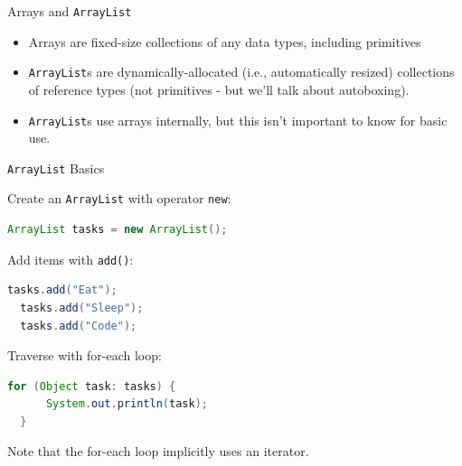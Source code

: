 \documentclass{beamer}
\begin{document}
\begin{frame}[fragile]{Arrays and {\tt ArrayList}}


\begin{itemize}
\item Arrays are fixed-size collections of any data types, including primitives
\item {\tt ArrayList}s are dynamically-allocated (i.e., automatically resized) collections of reference types (not primitives - but we'll talk about autoboxing).
\item {\tt ArrayList}s use arrays internally, but this isn't important to know for basic use.
\end{itemize}


\end{frame}

\begin{frame}[fragile]{{\tt ArrayList} Basics}


Create an {\tt ArrayList} with operator {\tt new}:
\begin{lstlisting}[language=Java]
  ArrayList tasks = new ArrayList();
\end{lstlisting}
Add items with {\tt add()}:
\begin{lstlisting}[language=Java]
  tasks.add("Eat");
  tasks.add("Sleep");
  tasks.add("Code");
\end{lstlisting}
Traverse with for-each loop:
\begin{lstlisting}[language=Java]
  for (Object task: tasks) {
      System.out.println(task);
  }
\end{lstlisting}

Note that the for-each loop implicitly uses an iterator.

\end{frame}
\end{document}
